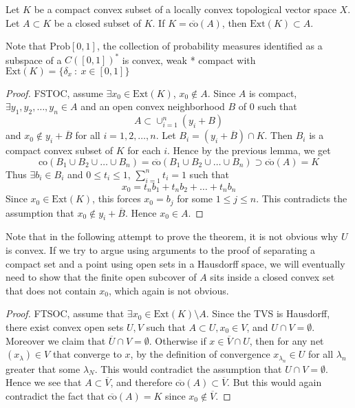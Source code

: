 \begin{theorem}
  Let $K$ be a compact convex subset of a locally convex topological
  vector space $X$. Let $A \subset K$ be a closed subset of $K$. If
  $K = \overline{\textrm{co}}(A)$, then $\textrm{Ext}(K) \subset A$.
\end{theorem}

Note that $\textrm{Prob}[0, 1]$, the collection of probability
measures identified as a subspace of a $C([0, 1])^*$ is convex, weak
* compact with $\textrm{Ext}(K) = \{ \delta_x  \ : \  x \in [0, 1] \}$
\begin{proof}
  FSTOC, assume $\exists x_0 \in \textrm{Ext}(K)$, $x_0 \not \in A$.
  Since $A$ is compact, $\exists y_1 , y_2 , \ldots , y_n \in A$ and
  an open convex neighborhood $B$ of $0$ such that $$A \subset
  \cup_{i = 1}^{n}(y_i + B)$$
  and $x_0 \not\in y_i + \overline{B}$ for all $i = 1, 2, \ldots, n$.
  Let $B_i = (y_i + \overline{B}) \cap K$. Then $B_i$ is a compact
  convex subset of $K$ for each $i$. Hence by the previous lemma, we get \[
    \textrm{co}(B_1 \cup B_2 \cup \ldots \cup B_n) =
    \overline{\textrm{co}}(B_1 \cup B_2 \cup \ldots \cup B_n) \supset
    \overline{\textrm{co}}(A) = K
  \]
  Thus $\exists b_i \in B_i$ and $0 \le t_i \le 1$, $\sum_{i = 1}^{n}
  t_i = 1$ such that
  \marginnote{\scriptsize \textcolor{ red}{I struggle at finding the
  contradiction}}
  \[
    x_0 = t_n b_1 + t_n b_2 + \ldots + t_n b_n
  \]
  Since $x_0 \in \textrm{Ext}(K)$, this forces $x_0 = b_j$ for some
  $1 \le j \le n$.
  This contradicts the assumption that $x_0 \not\in y_i +
  \overline{B}$. Hence $x_0 \in A$.
\end{proof}

Note that in the following attempt to prove the theorem, it is not
obvious why $U$ is convex. If we try to argue using arguments to the
proof of separating a compact set and a point using open sets in a
Hausdorff space, we will eventually need to show that the finite
open subcover of $A$ sits inside a closed convex set that does not
contain $x_0$, which again is not obvious.
\begin{proof}
  FTSOC, assume that $\exists x_0 \in \textrm{Ext}(K)\setminus A$.
  \marginnote{ \scriptsize \textcolor{red}{Why is $U$ convex?}}
  Since the TVS is Hausdorff, there exist convex open sets $U,
  V$ such that $A \subset U, x_0 \in V$, and $U \cap V = \emptyset$.
  Moreover we claim that $\overline{U} \cap V = \emptyset$. Otherwise if $x \in
  \overline{V} \cap U$, then for any net $(x_\lambda) \in V$ that
  converge to $x$, by the definition of convergence $x_{\lambda_n}
  \in U$ for all $\lambda_n$ greater that some $\lambda_N$. This
  would contradict the assumption that $U\cap V = \emptyset$. Hence
  we see that $A \subset \overline{V}$, and therefore
  $\overline{\textrm{co}}(A) \subset \overline{V}$. But this would
  again contradict the fact that $\overline{\textrm{co}}(A) = K$
  since $x_0 \notin \overline{V}$.
\end{proof}


